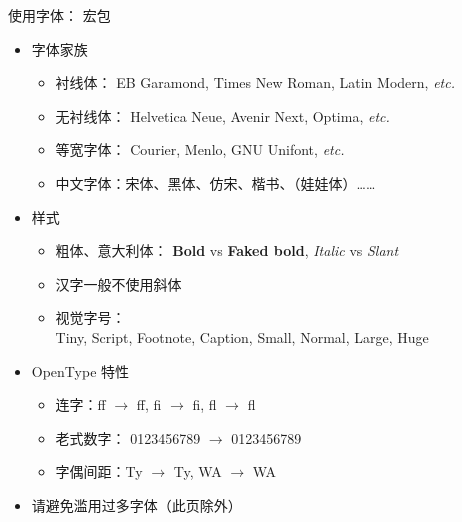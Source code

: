 \begin{frame}{使用字体： 宏包}
\begin{itemize}
  \item<1-> 字体家族 

    \begin{itemize}
      \item 衬线体：
        {\EBGaramond EB Garamond},
        {\TimesNewRoman Times New Roman},
        {\LatinRomanX Latin Modern}, \textit{etc.}
      \item 无衬线体：
        {\Helvetica Helvetica Neue},
        {\Avenir Avenir Next},
        {\Optima Optima}, \textit{etc.}
      \item 等宽字体：
        {\Courier Courier},
        {\Menlo Menlo},
        {\Unifont GNU Unifont}, \textit{etc.}
      \item 中文字体：宋体、{\HeiTi 黑体}、{\FangSong 仿宋}、{\KaiTi 楷书}、{\WaWa （娃娃体）}……
    \end{itemize}

  \item<2-> 样式 

    \begin{itemize}
      \item 粗体、意大利体：
        \textbf{Bold} vs {\textbf{Faked bold}},
        \textit{Italic} vs {\textsl{Slant}}
      \item<3-> \alert{汉字一般不使用斜体}
      \item<4-> 视觉字号：\\
        {\LatinRomanV    Tiny},
        {\LatinRomanVI   Script},
        {\LatinRomanVII  Footnote},
        {\LatinRomanVIII Caption},
        {\LatinRomanIX   Small},
        {\LatinRomanX    Normal},
        {\LatinRomanXII  Large},
        {\LatinRomanXVII Huge}
    \end{itemize}

  \item<5-> OpenType 特性

    \begin{itemize}
      \item 连字：{f}{f} $\to$ ff, {f}{i} $\to$ fi, {f}{l} $\to$ fl
      \item 老式数字：
        0123456789 $\to$ {0123456789}
      \item 字偶间距：{T}{y} $\to$ Ty, {W}{A} $\to$ WA
    \end{itemize}

  \item<6-> \alert{请避免滥用过多字体{\tiny （此页除外）}}
\end{itemize}
\vspace{-0.2cm}
\end{frame}

